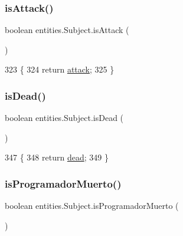 \subsubsection{\texorpdfstring{is\+Attack()}{isAttack()}}
{\footnotesize\ttfamily boolean entities.\+Subject.\+is\+Attack (\begin{DoxyParamCaption}{ }\end{DoxyParamCaption})\hspace{0.3cm}{\ttfamily [inline]}}


\begin{DoxyCode}
323                               \{
324         \textcolor{keywordflow}{return} \mbox{\hyperlink{classentities_1_1_subject_a97663ba9e9a8708bf9affe4d9bf8de65}{attack}};
325     \}
\end{DoxyCode}
\mbox{\label{classentities_1_1_subject_a970082c9d187619c1a27dceec8b3b908}} 
\subsubsection{\texorpdfstring{is\+Dead()}{isDead()}}
{\footnotesize\ttfamily boolean entities.\+Subject.\+is\+Dead (\begin{DoxyParamCaption}{ }\end{DoxyParamCaption})\hspace{0.3cm}{\ttfamily [inline]}}


\begin{DoxyCode}
347                             \{
348         \textcolor{keywordflow}{return} \mbox{\hyperlink{classentities_1_1_subject_aab6a2f2446349b10689270b86e7931a4}{dead}};
349     \}
\end{DoxyCode}
\mbox{\label{classentities_1_1_subject_a2fa68c05da096ebbd98b65b91d73abc3}} 
\subsubsection{\texorpdfstring{is\+Programador\+Muerto()}{isProgramadorMuerto()}}
{\footnotesize\ttfamily boolean entities.\+Subject.\+is\+Programador\+Muerto (\begin{DoxyParamCaption}{ }\end{DoxyParamCaption})\hspace{0.3cm}{\ttfamily [inline]}}


